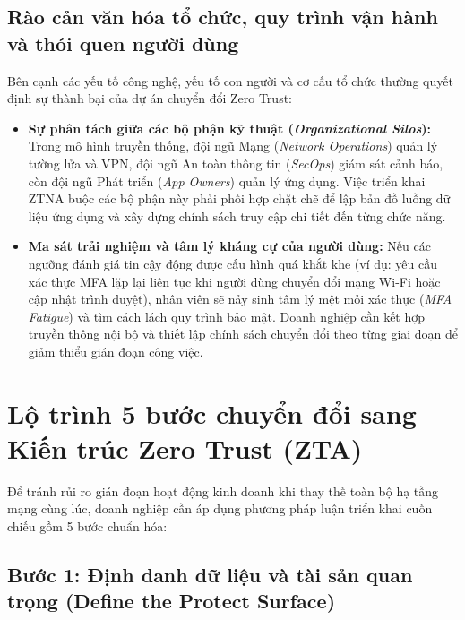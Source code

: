 \subsection{Rào cản văn hóa tổ chức, quy trình vận hành và thói quen người dùng}
\label{subsec:5_2_3}

Bên cạnh các yếu tố công nghệ, yếu tố con người và cơ cấu tổ chức thường quyết định sự thành bại của dự án chuyển đổi Zero Trust:

\begin{itemize}
    \item \textbf{Sự phân tách giữa các bộ phận kỹ thuật (\textit{Organizational Silos}):} Trong mô hình truyền thống, đội ngũ Mạng (\textit{Network Operations}) quản lý tường lửa và VPN, đội ngũ An toàn thông tin (\textit{SecOps}) giám sát cảnh báo, còn đội ngũ Phát triển (\textit{App Owners}) quản lý ứng dụng. Việc triển khai ZTNA buộc các bộ phận này phải phối hợp chặt chẽ để lập bản đồ luồng dữ liệu ứng dụng và xây dựng chính sách truy cập chi tiết đến từng chức năng.
    \item \textbf{Ma sát trải nghiệm và tâm lý kháng cự của người dùng:} Nếu các ngưỡng đánh giá tin cậy động được cấu hình quá khắt khe (ví dụ: yêu cầu xác thực MFA lặp lại liên tục khi người dùng chuyển đổi mạng Wi-Fi hoặc cập nhật trình duyệt), nhân viên sẽ nảy sinh tâm lý mệt mỏi xác thực (\textit{MFA Fatigue}) và tìm cách lách quy trình bảo mật. Doanh nghiệp cần kết hợp truyền thông nội bộ và thiết lập chính sách chuyển đổi theo từng giai đoạn để giảm thiểu gián đoạn công việc.
\end{itemize}

\section{Lộ trình 5 bước chuyển đổi sang Kiến trúc Zero Trust (ZTA)}
\label{sec:5_3}

Để tránh rủi ro gián đoạn hoạt động kinh doanh khi thay thế toàn bộ hạ tầng mạng cùng lúc, doanh nghiệp cần áp dụng phương pháp luận triển khai cuốn chiếu gồm 5 bước chuẩn hóa:

\subsection{Bước 1: Định danh dữ liệu và tài sản quan trọng (Define the Protect Surface)}
\label{subsec:5_3_1}

